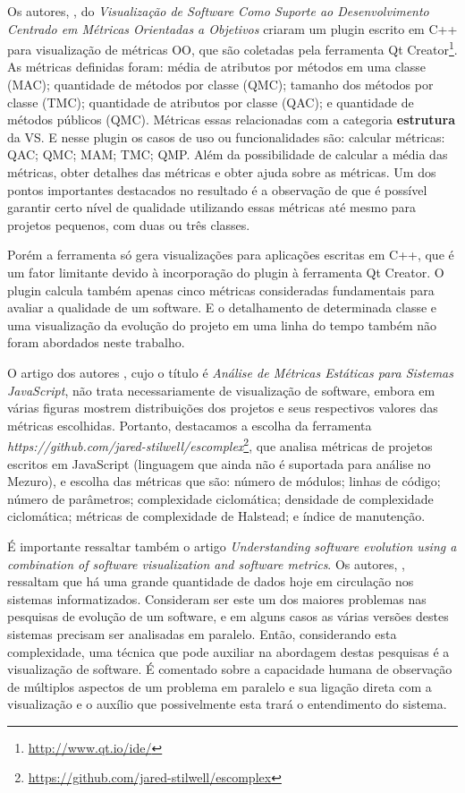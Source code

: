 Os autores, , do \textit{Visualização de Software
Como Suporte ao Desenvolvimento Centrado em Métricas Orientadas a Objetivos}
criaram um plugin escrito em C++ para visualização de métricas OO, que são
coletadas pela ferramenta Qt Creator\footnote{\url{http://www.qt.io/ide/}}. As
métricas definidas foram: média de atributos por métodos em uma classe (MAC);
quantidade de métodos por classe (QMC); tamanho dos métodos por classe (TMC);
quantidade de atributos por classe (QAC); e quantidade de métodos públicos
(QMC). Métricas essas relacionadas com a categoria \textbf{estrutura} da VS.
E nesse plugin os casos de uso ou funcionalidades
são: calcular métricas: QAC; QMC; MAM; TMC; QMP. Além da
possibilidade de calcular a média das métricas, obter detalhes das métricas e
obter ajuda sobre as métricas. Um dos pontos importantes destacados no
resultado é a observação de que é possível garantir certo nível de qualidade
utilizando essas métricas até mesmo para projetos pequenos, com duas ou três
classes.

Porém a ferramenta só gera visualizações para aplicações escritas em C++, que é
um fator limitante devido à incorporação do plugin à ferramenta Qt Creator. O
plugin calcula também apenas cinco métricas consideradas fundamentais para
avaliar a qualidade de um software. E o detalhamento de determinada classe e
uma visualização da evolução do projeto em uma linha do tempo também não foram
abordados neste trabalho.

O artigo dos autores , cujo o título é \textit{Análise de
Métricas Estáticas para Sistemas JavaScript}, não trata necessariamente de
visualização de software, embora em várias figuras mostrem distribuições dos
projetos e seus respectivos valores das métricas escolhidas. Portanto,
destacamos a escolha da ferramenta
\textit{https://github.com/jared-stilwell/escomplex}\footnote{\url{https://github.com/jared-stilwell/escomplex}},
que analisa métricas de projetos escritos em JavaScript (linguagem que ainda
não é suportada para análise no Mezuro), e escolha das métricas que são: número
de módulos; linhas de código; número de parâmetros; complexidade ciclomática;
densidade de complexidade ciclomática; métricas de complexidade de Halstead; e
índice de manutenção.

É importante ressaltar também o artigo \textit{Understanding software evolution
using a combination of software visualization and software metrics}. Os
autores, , ressaltam que há uma grande
quantidade de dados hoje em circulação nos sistemas informatizados. Consideram ser este um
dos maiores problemas nas pesquisas de evolução de um software, e em alguns
casos as várias versões destes sistemas precisam ser analisadas em paralelo.
Então, considerando esta complexidade, uma técnica que pode auxiliar na
abordagem destas pesquisas é a visualização de software. É comentado sobre a
capacidade humana de observação de múltiplos aspectos de um problema em
paralelo e sua ligação direta com a visualização e o auxílio que possivelmente
esta trará o entendimento do sistema.

